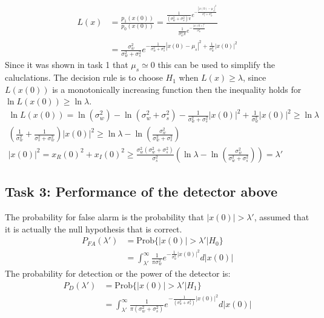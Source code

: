 \begin{align}
    L(x) & = \frac{p_1(x(0))}{p_0(x(0))} = \frac{\frac{1}{(\sigma_w^2+\sigma_s^2)\pi}e^{-\frac{|x(0)-\mu_s|^2}{\sigma_s^2+\sigma_w^2}}}{\frac{1}{\sigma_w^2\pi}e^{-\frac{|x(0)|^2}{\sigma_w^2}}}\nonumber\\
    & = \frac{\sigma_w^2}{\sigma_w^2+\sigma_s^2}e^{-\frac{1}{\sigma_w^2+\sigma_s^2}|x(0)-\mu_s|^2+\frac{1}{\sigma_w^2}|x(0)|^2}\nonumber
\end{align}
Since it was shown in task 1 that $\mu_s \simeq 0$ this can be used to simplify the caluclations. The decision rule is to choose $H_1$ when $L(x) \geq \lambda$, since $L(x(0))$ is a monotonically increasing function then the inequality holds for $\ln L(x(0)) \geq \ln\lambda$.
\begin{align}
    \ln L(x(0)) = \ln (\sigma_w^2)-\ln (\sigma_w^2+\sigma_s^2)-\frac{1}{\sigma_w^2+\sigma_s^2}|x(0)|^2+\frac{1}{\sigma_w^2}|x(0)|^2 \geq \ln\lambda\nonumber\\
    (\frac{1}{\sigma_w^2}+\frac{1}{\sigma_s^2+\sigma_w^2})|x(0)|^2 \geq \ln\lambda-\ln (\frac{\sigma_w^2}{\sigma_w^2+\sigma_s^2})\nonumber\\
    |x(0)|^2 = x_R(0)^2+x_I(0)^2 \geq \frac{\sigma_w^2(\sigma_w^2+\sigma_s^2)}{\sigma_s^2}(\ln\lambda-\ln (\frac{\sigma_w^2}{\sigma_w^2+\sigma_s^2})) = \lambda'\nonumber
\end{align}
\subsection{Task 3: Performance of the detector above}
The probability for false alarm is the probability that $|x(0)|>\lambda'$, assumed that it is actually the null hypothesis that is correct. 
\begin{align}
    P_{FA}(\lambda') & = \text{Prob}\{|x(0)|>\lambda'\vert H_0\}\nonumber\\
    & = \int_{\lambda'}^{\infty}\frac{1}{\pi\sigma_w^2}e^{-\frac{1}{\sigma_w^2}|x(0)|^2}d|x(0)|\nonumber
\end{align}
The probability for detection or the power of the detector is:
\begin{align}
    P_D(\lambda') & = \text{Prob}\{|x(0)|>\lambda'\vert H_1\}\nonumber\\
    & = \int_{\lambda'}^{\infty}\frac{1}{\pi(\sigma_w^2+\sigma_s^2)}e^{-\frac{1}{(\sigma_w^2+\sigma_s^2)}|x(0)|^2}d|x(0)|\nonumber
\end{align}
